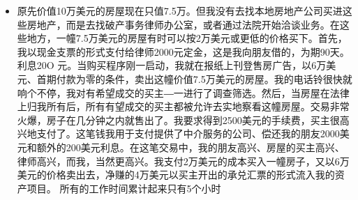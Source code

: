 \documentclass[UTF8,a4paper,8pt]{ctexart}
\begin{document}
\begin{itemize}
 	\item 原先价值10万美元的房屋现在只值7.5万。但我没有去找本地房地产公司买进这些房地产，而是去找破产事务律师办公室，或者通过法院开始洽谈业务。在这些地方，一幢7.5万美元的房屋有时可以按2万美元或更低的价格买下。首先，我以现金支票的形式支付给律师2000元定金，这是我向朋友借的，为期90天。 利息20O 元。当购买程序刚一启动，我就在报纸上刊登售房广告，以6万美元、首期付款为零的条件，卖出这幢价值7.5万美元的房屋。我的电话铃很快就响个不停，我对有希望成交的买主―一进行了调查筛选。然后，当房屋在法律上归我所有后，所有有望成交的买主都被允许去实地察看这幢房屋。交易非常火爆，房子在几分钟之内就售出了。我要求得到2500美元的手续费，买主很高兴地支付了。这笔钱我用于支付提供了中介服务的公司、偿还我的朋友2000美元和额外的200美元利息。在这笔交易中，我的朋友高兴、房屋的买主高兴、律师高兴，而我，当然更高兴。我支付2万美元的成本买入一幢房子，又以6万美元的价格卖出去，净赚的4万美元以买主开出的承兑汇票的形式流入我的资产项目。 所有的工作时间累计起来只有5个小时
 	

\end{itemize}
\end{document}

